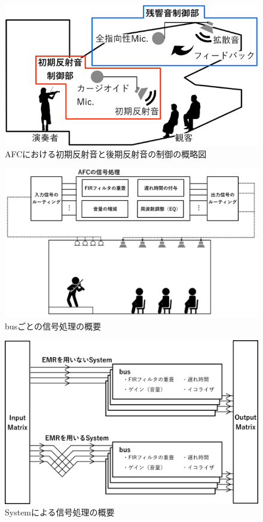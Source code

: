 \documentclass[11pt,a4j]{jreport}
\begin{document}
\begin{figure}[H]
  \centering
  \includegraphics[width=0.8\linewidth]{images/AFCsystemOverView.png}
  \caption{AFCにおける初期反射音と後期反射音の制御の概略図}
  \label{fig:AFCにおける初期反射音と後期反射音の制御の概略図}
\end{figure}

\newpage

\begin{figure}[H]
  \centering
  \includegraphics[width=0.9\linewidth]{images/AFCbusProcessing.png}
  \caption{busごとの信号処理の概要}
  \label{fig:busごとの信号処理の概要}
\end{figure}


\begin{figure}[H]
  \centering
  \includegraphics[width=0.9\linewidth]{images/AFCsystemProcessing.png}
  \caption{Systemによる信号処理の概要}
  \label{fig:Systemによる信号処理の概要}
\end{figure}
\end{document}
